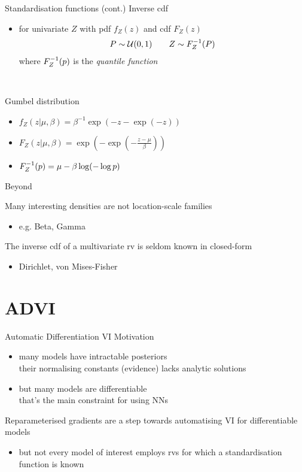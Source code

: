 \documentclass[14pt,dvipsnames]{beamer}
\begin{document}
\begin{frame}{Standardisation functions (cont.)}
	Inverse cdf
	\begin{itemize}
		\item for univariate $Z$ with pdf $f_Z(z)$ and cdf $F_Z(z)$
		\begin{equation*}
		\begin{aligned}
			P \sim \mathcal U(0, 1) \qquad Z \sim {F}^{-1}_Z(P) 
		\end{aligned}		
		\end{equation*}
		where ${F}^{-1}_Z(p)$ is the \emph{quantile function}
	\end{itemize}
	
	~ \pause
	
	Gumbel distribution
	\begin{itemize}
		\item $f_Z(z|\mu, \beta) = \beta^{-1}\exp(-z -\exp(-z))$ 
		\item $F_Z(z|\mu, \beta) = \exp(-\exp(-\frac{z-\mu}{\beta}))$
		\item ${F}^{-1}_Z(p) = \mu - \beta \log( - \log p)$
	\end{itemize}
\end{frame}

\begin{frame}{Beyond}

	Many interesting densities are not location-scale families
	\begin{itemize}
		\item e.g. Beta, Gamma
	\end{itemize} \pause
	
	The inverse cdf of a multivariate rv is seldom known in closed-form
	\begin{itemize}
		\item Dirichlet, von Mises-Fisher
	\end{itemize}

\end{frame}

\section{ADVI}

\begin{frame}{Automatic Differentiation VI}
	Motivation
	\begin{itemize}
		\item many models have intractable posteriors\\
		their normalising constants (evidence) lacks analytic solutions \pause
		\item but many models are differentiable\\
		that's the main constraint for using NNs \pause
	\end{itemize}

	Reparameterised gradients are a step towards automatising VI for differentiable models \pause
	\begin{itemize}
		\item but not every model of interest employs rvs for which a standardisation function is known
	\end{itemize}
	
\end{frame}
\end{document}
